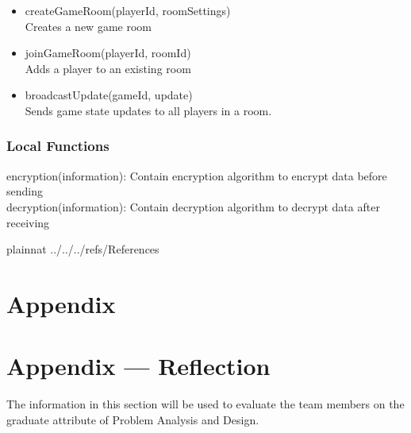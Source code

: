 \documentclass[12pt, titlepage]{article}
\begin{document}
\begin{itemize}
\item createGameRoom(playerId, roomSettings)\\
Creates a new game room


\item joinGameRoom(playerId, roomId)\\
Adds a player to an existing room

\item broadcastUpdate(gameId, update)\\
Sends game state updates to all players in a room.

\end{itemize}


\subsubsection{Local Functions}
\hspace{1.5em}encryption(information): Contain encryption algorithm to encrypt data before sending\\
\indent decryption(information): Contain decryption algorithm to decrypt data after receiving



 {plainnat}
 {../../../refs/References}

\newpage

\section{Appendix} \label{Appendix}


\newpage{}

\section*{Appendix --- Reflection}


The information in this section will be used to evaluate the team members on the
graduate attribute of Problem Analysis and Design.
\end{document}
